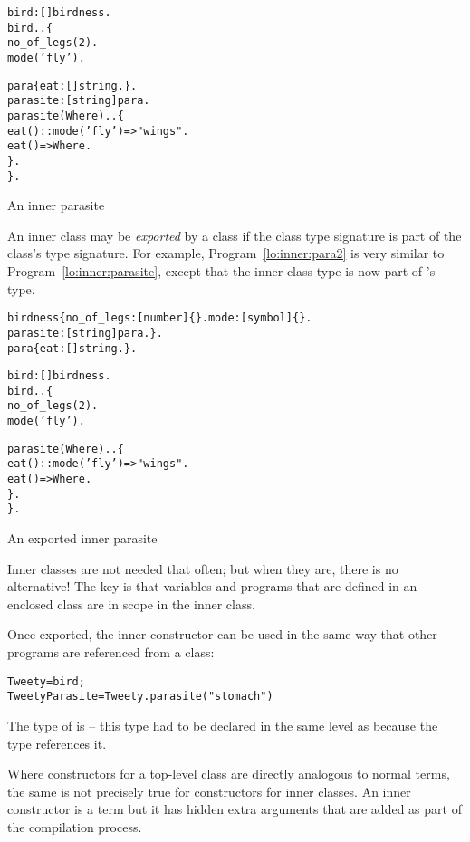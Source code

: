 \begin{program}
\vspace{0.5ex}
\begin{boxed}
\begin{alltt}
bird:[]\conarrow{}birdness.
bird..\{
  no_of_legs(2).
  mode('fly').
  
  para\impl{}\{ eat:[]\funarrow{}string. \}.
  parasite:[string]\conarrow{}para.
  parasite(Where)..\{
    eat()::mode('fly')=>"wings".
    	eat()=>Where.
  \}.
\}.
\end{alltt}
\vspace{-2ex}
\end{boxed}
\caption{An inner parasite}
\label{lo:inner:parasite}
\end{program}

An inner class may be \emph{exported} by a class if the class type signature is part of the class's type signature. For example, Program~\vref{lo:inner:para2} is very similar to Program~\ref{lo:inner:parasite}, except that the inner class type is now part of 's type.
\begin{program}
\vspace{0.5ex}
\begin{boxed}
\begin{alltt}
birdness \impl \{ no_of_legs:[number]\{\}. mode:[symbol]\{\}.
    parasite:[string]\conarrow{}para. \}.
para\impl{}\{ eat:[]\funarrow{}string. \}.

bird:[]\conarrow{}birdness.
bird..\{
  no_of_legs(2).
  mode('fly').
  
  parasite(Where)..\{
    eat()::mode('fly')=>"wings".
    	eat()=>Where.
  \}.
\}.
\end{alltt}
\end{boxed}
\vspace{-2ex}
\caption{An exported inner parasite}
\label{lo:inner:para2}
\end{program}
\begin{aside}
Inner classes are not needed that often; but when they are, there is no alternative! The key is that variables and programs that are defined in an enclosed class are in scope in the inner class.
\end{aside}
Once exported, the inner constructor can be used in the same way that other programs are referenced from a class:
\begin{alltt}
Tweety = bird;
TweetyParasite = Tweety.parasite("stomach")
\end{alltt}
The type of  is  -- this type had to be declared in the same level as  because the  type references it.
\begin{aside}
Where constructors for a top-level class are directly analogous to normal \prolog terms, the same is not precisely true for constructors for inner classes. An inner constructor is a term but it has hidden extra arguments that are added as part of the compilation process.
\end{aside}




